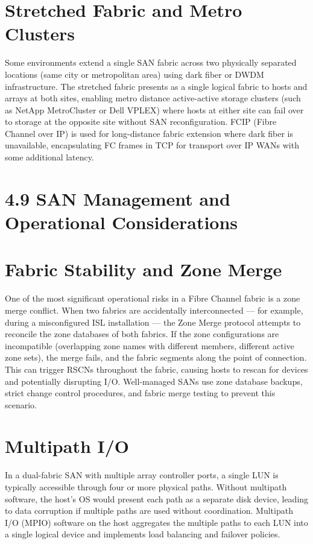 \section{Stretched Fabric and Metro Clusters}
Some environments extend a single SAN fabric across two physically separated locations (same city or metropolitan area) using dark fiber or DWDM infrastructure. The stretched fabric presents as a single logical fabric to hosts and arrays at both sites, enabling metro distance active-active storage clusters (such as NetApp MetroCluster or Dell VPLEX) where hosts at either site can fail over to storage at the opposite site without SAN reconfiguration. FCIP (Fibre Channel over IP) is used for long-distance fabric extension where dark fiber is unavailable, encapsulating FC frames in TCP for transport over IP WANs with some additional latency.

\section{4.9 SAN Management and Operational Considerations}
\section{Fabric Stability and Zone Merge}
One of the most significant operational risks in a Fibre Channel fabric is a zone merge conflict. When two fabrics are accidentally interconnected --- for example, during a misconfigured ISL installation --- the Zone Merge protocol attempts to reconcile the zone databases of both fabrics. If the zone configurations are incompatible (overlapping zone names with different members, different active zone sets), the merge fails, and the fabric segments along the point of connection. This can trigger RSCNs throughout the fabric, causing hosts to rescan for devices and potentially disrupting I/O. Well-managed SANs use zone database backups, strict change control procedures, and fabric merge testing to prevent this scenario.

\section{Multipath I/O}
In a dual-fabric SAN with multiple array controller ports, a single LUN is typically accessible through four or more physical paths. Without multipath software, the host's OS would present each path as a separate disk device, leading to data corruption if multiple paths are used without coordination. Multipath I/O (MPIO) software on the host aggregates the multiple paths to each LUN into a single logical device and implements load balancing and failover policies.

